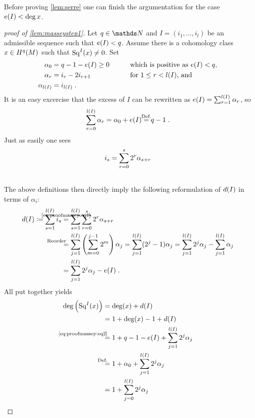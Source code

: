 Before proving \autoref{lem:serre} one can finish the argumentation for
the case $e(I)<\deg x$.
\begin{proof}[proof of \autoref{lem:masseystep1}]
  Let $q\in\Nat$ and $I=(i_1,\dotsc,i_l)$ be an admissible sequence such that
  $e(I)<q$.
  Assume there is a cohomology class $x\in H^q(M)$ such that $\mathrm{Sq}^{I}(x)\neq0$.
  Set
  \begin{alignat*}{4}
    \alpha_0 &= q-1-e(I)\geq 0 &\qquad&\text{which is positive as $e(I)<q$,} \\
    \alpha_r &= i_{r}-2i_{r+1}  &&\text{for $1\leq r< l(I)$, and} \\ 
    \alpha_{l(I)} &= i_{l(I)}
    \;.
  \end{alignat*}
  It is an easy excercise that the excess of $I$ can be rewritten as
  $e(I)=\sum_{r=1}^{l(I)}\alpha_r$, so
  \begin{gather}\label{eq:alpha0}
    \sum_{r=0}^{\l(I)}\alpha_r = \alpha_0 + \e(I) \cequalsby{Def.} q-1
    \;.
  \end{gather}
  Just as easily one sees
  \begin{align}\label{eq:proofmassey:eq1}
    i_s
    &= \sum_{r=0}^{s}2^r\alpha_{s+r}\\\notag
  \end{align}
  The above definitions then directly imply the following reformulation
  of $d(I)$ in terms of $\alpha_i$:
  \begin{align}\notag
    \d(I) \coloneqq \sum_{s=1}^{\l(I)}i_s 
    &\cequalsby{\eqref{eq:proofmassey:eq1}}
      \sum_{s=1}^{\l(I)}\sum_{r=0}^{s}2^r\alpha_{s+r}\\\notag
    &\equalsby{Reorder} \sum_{j=1}^{\l(I)}
      \left(\sum_{m=0}^{j-1}2^m\right)\alpha_j
      = \sum_{j=1}^{\l(I)}(2^j-1)\alpha_j 
      = \sum_{j=1}^{\l(I)}2^j\alpha_j
      - \sum_{j=1}^{\l(I)}\alpha_j\\
    \label{eq:proofmassey:eq2}
    &= \sum_{j=1}^{\l(I)}2^j\alpha_j
      - \e(I)
      \;.
  \end{align}
  All put together yields
  \begin{align*}
    \deg\left(\Sq I(x)\right)
    &= \deg(x) + \d(I)\\
    &= 1 + \deg(x) -1 +\d(I) \\
    &\equalsby{\eqref{eq:proofmassey:eq2}}
      1 + q - 1 - \e(I) + \sum_{j=1}^{\l(I)}2^j\alpha_j \\
    &\equalsby{Def.}
      1 + \alpha_0 + \sum_{j=1}^{\l(I)}2^j\alpha_j \\
    &= 1 + \sum_{j=0}^{\l(I)}2^j\alpha_j

\end{align*}
\end{proof}
